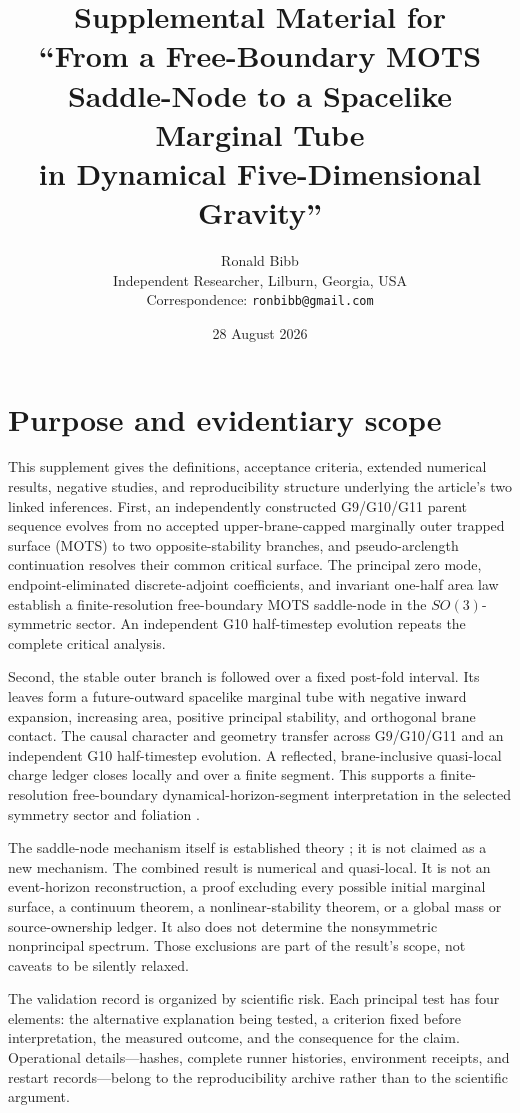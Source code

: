 \documentclass[11pt]{article}
\title{Supplemental Material for\\
``From a Free-Boundary MOTS Saddle-Node to a Spacelike Marginal Tube\\
in Dynamical Five-Dimensional Gravity''}
\author{Ronald Bibb\\
\small Independent Researcher, Lilburn, Georgia, USA\\
\small Correspondence: \texttt{ronbibb@gmail.com}}
\date{28 August 2026}
\begin{document}
\maketitle

\section{Purpose and evidentiary scope}

This supplement gives the definitions, acceptance criteria, extended
numerical results, negative studies, and reproducibility structure underlying
the article's two linked inferences.  First, an independently constructed
G9/G10/G11 parent sequence evolves from no accepted upper-brane-capped
marginally outer trapped surface (MOTS) to two opposite-stability branches,
and pseudo-arclength continuation resolves their common critical surface.
The principal zero mode, endpoint-eliminated discrete-adjoint coefficients,
and invariant one-half area law establish a finite-resolution free-boundary
MOTS saddle-node in the $SO(3)$-symmetric sector.  An independent G10
half-timestep evolution repeats the complete critical analysis.

Second, the stable outer branch is followed over a fixed post-fold interval.
Its leaves form a future-outward spacelike marginal tube with negative inward
expansion, increasing area, positive principal stability, and orthogonal brane
contact.  The causal character and geometry transfer across G9/G10/G11 and an
independent G10 half-timestep evolution.  A reflected, brane-inclusive
quasi-local charge ledger closes locally and over a finite segment.  This
supports a finite-resolution free-boundary dynamical-horizon-segment
interpretation in the selected symmetry sector and foliation
\cite{AshtekarKrishnan2002,AshtekarKrishnan2003}.

The saddle-node mechanism itself is established theory
\cite{BoothCoxOkpala2026}; it is not claimed as a new mechanism.  The combined
result is numerical and quasi-local.  It is not an event-horizon
reconstruction, a proof excluding every possible initial marginal surface, a
continuum theorem, a nonlinear-stability theorem, or a global mass or
source-ownership ledger.  It also does not determine the nonsymmetric
nonprincipal spectrum.  Those exclusions are part of the result's scope, not
caveats to be silently relaxed.

The validation record is organized by scientific risk.  Each principal test
has four elements: the alternative explanation being tested, a criterion fixed
before interpretation, the measured outcome, and the consequence for the
claim.  Operational details---hashes, complete runner histories, environment
receipts, and restart records---belong to the reproducibility archive rather
than to the scientific argument.
\end{document}
